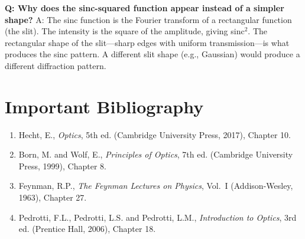 \textbf{Q: Why does the sinc-squared function appear instead of a simpler shape?}
A: The sinc function is the Fourier transform of a rectangular function (the slit). The intensity is the square of the amplitude, giving sinc$^2$. The rectangular shape of the slit---sharp edges with uniform transmission---is what produces the sinc pattern. A different slit shape (e.g., Gaussian) would produce a different diffraction pattern.
\section*{Important Bibliography}

\begin{enumerate}
\item Hecht, E., \textit{Optics}, 5th ed. (Cambridge University Press, 2017), Chapter 10.
\item Born, M. and Wolf, E., \textit{Principles of Optics}, 7th ed. (Cambridge University Press, 1999), Chapter 8.
\item Feynman, R.P., \textit{The Feynman Lectures on Physics}, Vol.\ I (Addison-Wesley, 1963), Chapter 27.
\item Pedrotti, F.L., Pedrotti, L.S. and Pedrotti, L.M., \textit{Introduction to Optics}, 3rd ed. (Prentice Hall, 2006), Chapter 18.
\end{enumerate}

